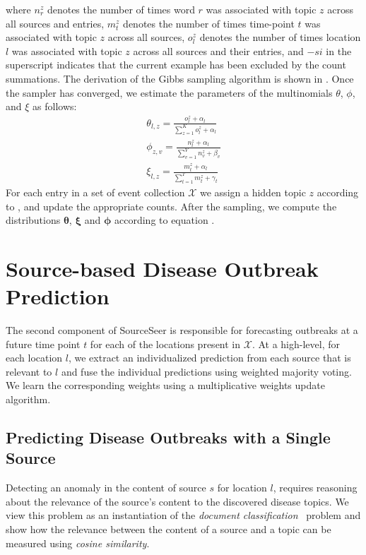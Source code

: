\documentclass[twoside,leqno,twocolumn]{article}
\newcommand{\fullmodel}{{{\sf SourceSeer}}\xspace}
\begin{document}
\noindent where $n^{z}_{r}$ denotes the number of times word $r$ was associated with topic $z$ across all sources and entries, $m^{z}_{t}$ denotes the number of times time-point $t$ was associated with topic $z$ across all sources, $o^z_l$ denotes the number of times location $l$ was associated with topic $z$ across all sources and their entries, and $-si$ in the superscript indicates that the current example has been excluded by the count summations. The derivation of the Gibbs sampling algorithm is shown in . Once the sampler has converged, we estimate the parameters of the multinomials $\theta$, $\phi$, and $\xi$ as follows:
{\small \begin{align}
\label{eq:updates}
\theta_{l,z} = \frac{o^z_l + \alpha_l}{\sum_{z=1}^K o^z_l + \alpha_l} \nonumber \\
\phi_{z,v} = \frac{n^z_l + \alpha_l}{\sum_{v=1}^V n^z_v + \beta_v}  \\
\xi_{l,z} = \frac{m^z_t + \alpha_l}{\sum_{t=1}^T m^z_t + \gamma_t} \nonumber
\end{align}}
For each entry in a set of event collection $\mathcal{X}$ we assign a hidden topic $z$ according to , and update the appropriate counts. After the sampling, we compute the distributions ${\boldsymbol \theta}$, ${\boldsymbol \xi}$ and ${\boldsymbol \phi}$ according to equation .   

\vspace{-10pt}
\section{Source-based Disease Outbreak Prediction}
\label{sec:pred}
The second component of \fullmodel is responsible for forecasting outbreaks at a future time point $t$ for each of the locations present in $\mathcal{X}$. At a high-level, for each location $l$, we extract an individualized prediction from each source that is relevant to $l$ and fuse the individual predictions using weighted majority voting. We learn the corresponding weights using a multiplicative weights update algorithm.
\vspace{-10pt}
\subsection{Predicting Disease Outbreaks with a Single Source}
\label{sec:source_pred}
Detecting an anomaly in the content of source $s$ for location $l$, requires reasoning about the relevance of the source's content to the discovered disease topics. We view this problem as an instantiation of the {\em document classification}~\cite{strehl:2000} problem and show how the relevance between the content of a source and a topic can be measured using {\em cosine similarity}.
\end{document}
